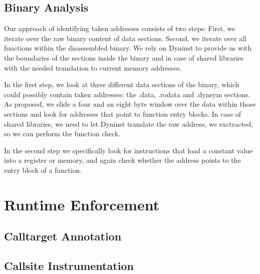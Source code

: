 \subsection{Binary Analysis}
Our approach of identifying taken addresses consists of two steps: First, we iterate over the raw binary content of data sections. Second, we iterate over all functions within the disassembled binary. We rely on Dyninst to provide us with the boundaries of the sections inside the binary and in case of shared libraries with the needed translation to current memory addresses.

In the first step, we look at three different data sections of the binary, which could possibly contain taken addresses: the .data, .rodata and .dynsym sections. As \cite{ZhangSekar00} proposed, we slide a four and an eight byte window over the data within those sections and look for addresses that point to function entry blocks. In case of shared libraries, we need to let Dyninst translate the raw address, we exctracted, so we can perform the function check.

In the second step we specifically look for instructions that load a constant value into a register or memory, and again check whether the address points to the entry block of a function.

\section{Runtime Enforcement}
\label{section:runtimeenforcement}



\subsection{Calltarget Annotation}
\label{subsection:patchingschema}

\subsection{Callsite Instrumentation}
\label{subsection:patchingschema}




